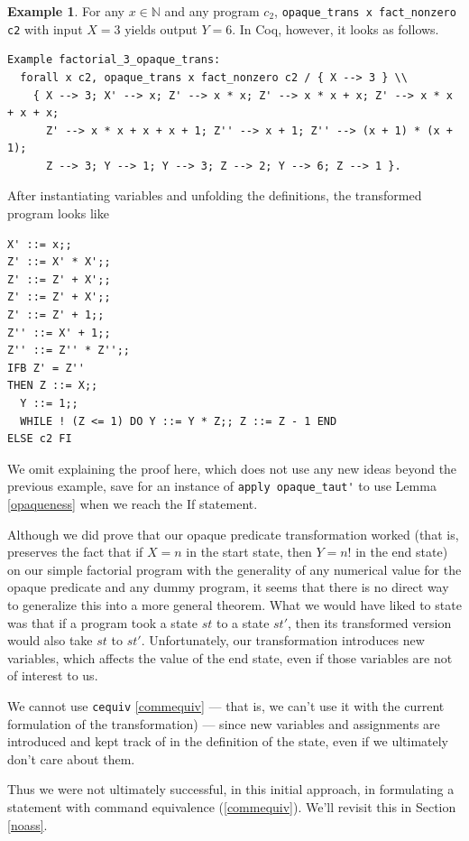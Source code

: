 \documentclass[12pt,notitlepage]{report}
\theoremstyle{plain}
\theoremstyle{definition}
\newtheorem{example}[theo]{Example}
\newcommand\N{\mathbb{N}}
\numberwithin{equation}{section}
\begin{document}
\begin{example}\label{firstfact}
    For any $x\in \N$ and any program $c_2$, \verb$opaque_trans x fact_nonzero c2$ with input $X=3$ yields output $Y=6$.  In Coq, however, it looks as follows.
    \begin{verbatim}Example factorial_3_opaque_trans:
  forall x c2, opaque_trans x fact_nonzero c2 / { X --> 3 } \\
    { X --> 3; X' --> x; Z' --> x * x; Z' --> x * x + x; Z' --> x * x + x + x;
      Z' --> x * x + x + x + 1; Z'' --> x + 1; Z'' --> (x + 1) * (x + 1); 
      Z --> 3; Y --> 1; Y --> 3; Z --> 2; Y --> 6; Z --> 1 }.\end{verbatim}
      After instantiating variables and unfolding the definitions, the transformed program looks like
      \begin{verbatim}
X' ::= x;;
Z' ::= X' * X';;
Z' ::= Z' + X';;
Z' ::= Z' + X';;
Z' ::= Z' + 1;;
Z'' ::= X' + 1;;
Z'' ::= Z'' * Z'';;
IFB Z' = Z''
THEN Z ::= X;;
  Y ::= 1;;
  WHILE ! (Z <= 1) DO Y ::= Y * Z;; Z ::= Z - 1 END
ELSE c2 FI
      \end{verbatim}
      We omit explaining the proof here, which does not use any new ideas beyond the previous example, save for an instance of \verb$apply opaque_taut'$ to use Lemma \ref{opaqueness} when we reach the If statement.
\end{example}

Although we did prove that our opaque predicate transformation worked (that is, preserves the fact that if $X=n$ in the start state, then $Y=n!$ in the end state) on our simple factorial program with the generality of any numerical value for the opaque predicate and any dummy program, it seems that there is no direct way to generalize this into a more general theorem.  What we would have liked to state was that if a program took a state $st$ to a state $st'$, then its transformed version would also take $st$ to $st'$.  Unfortunately, our transformation introduces new variables, which affects the value of the end state, even if those variables are not of interest to us.

\par We cannot use \verb$cequiv$ \eqref{commequiv} --- that is, we can't use it with the current formulation of the transformation) --- since new variables and assignments are introduced and kept track of in the definition of the state, even if we ultimately don't care about them.  
\par Thus we were not ultimately successful, in this initial approach, in formulating a statement with command equivalence (\ref{commequiv}).  We'll revisit this in Section \ref{noass}.
\end{document}
